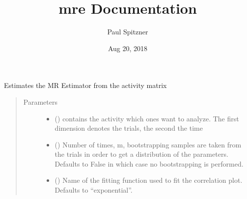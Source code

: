 \documentclass[letterpaper,10pt,english]{sphinxmanual}
\title{mre Documentation}
\date{Aug 20, 2018}
\author{Paul Spitzner}
\begin{document}
\maketitle
\sphinxtableofcontents
{}\label{\detokenize{index::doc}}


\begin{fulllineitems}
\label{\detokenize{index:proposal_function_definition.mr_estimator}}
Estimates the MR Estimator from the activity matrix
\begin{quote}\begin{description}
\item[{Parameters}] \leavevmode\begin{itemize}
\item {} 
 (\sphinxstyleliteralemphasis{\sphinxupquote{ (}}\sphinxstyleliteralemphasis{\sphinxupquote{,}}\sphinxstyleliteralemphasis{\sphinxupquote{)}}) \textendash{} contains the activity which ones want to analyze. The first dimension denotes the trials, the second the time

\item {} 
 (\sphinxstyleliteralemphasis{\sphinxupquote{, }}) \textendash{} Number of times, m, bootstrapping samples are taken from the trials in order to get a distribution of the
parameters. Defaults to False in which case no bootstrapping is performed.

\item {} 
 (\sphinxstyleliteralemphasis{\sphinxupquote{, }}\sphinxstyleliteralemphasis{\sphinxupquote{, }}\sphinxstyleliteralemphasis{\sphinxupquote{, }}) \textendash{} Name of the fitting function used to fit the correlation plot. Defaults to “exponential”.


\end{itemize}
\end{description}
\end{quote}
\end{fulllineitems}
\end{document}
